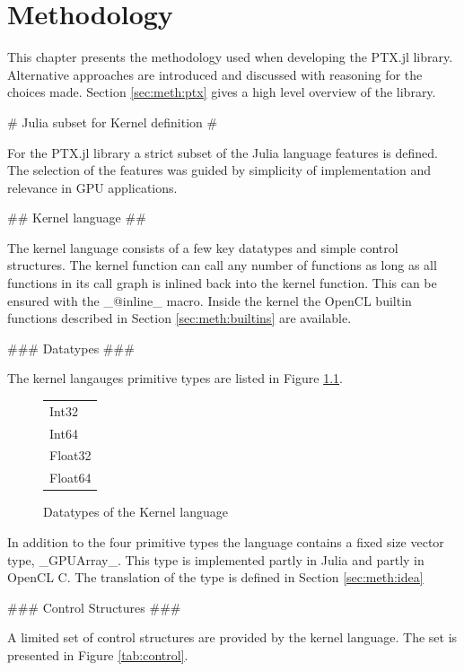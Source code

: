 \chapter{Methodology}
\label{chap:meth}
\begin{markdown}

This chapter presents the methodology used when developing the PTX.jl
library. Alternative approaches are introduced and discussed with
reasoning for the choices made. Section \ref{sec:meth:ptx} gives a
high level overview of the library.

# Julia subset for Kernel definition #

For the PTX.jl library a strict subset of the Julia language features
is defined. The selection of the features was guided by simplicity
of implementation and relevance in GPU applications.

## Kernel language ##
\label{sec:meth:kernel}

The kernel language consists of a few key datatypes and simple control
structures. The kernel function can call any number of functions as
long as all functions in its call graph is inlined back into the
kernel function. This can be ensured with the _@inline_ macro. Inside
the kernel the OpenCL builtin functions described in Section
\ref{sec:meth:builtins} are available.

### Datatypes ###

The kernel langauges primitive types are listed in Figure \ref{tab:datatypes}.

\begin{figure}[H]
  \centering
  \begin{tabular}{|l|}
  \hline
  Int32\\
  Int64\\
  Float32\\
  Float64\\
  \hline
  \end{tabular}
  \caption{Datatypes of the Kernel language}
  \label{tab:datatypes}
\end{figure}

In addition to the four primitive types the language contains a fixed
size vector type, _GPUArray_. This type is implemented partly in Julia
and partly in OpenCL C. The translation of the type is defined in
Section \ref{sec:meth:idea}

### Control Structures ###

A limited set of control structures are provided by the kernel
language. The set is presented in Figure \ref{tab:control}.


\end{markdown}
